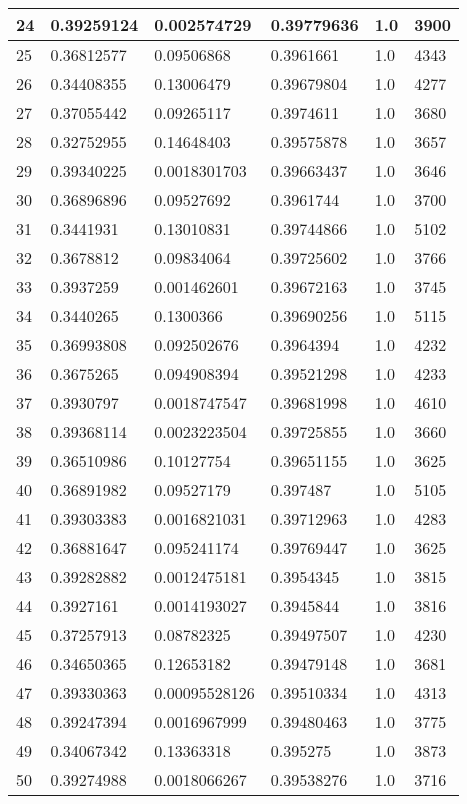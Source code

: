 \begin{longtable}{|l|l|l|l|l|l|}
24 & 0.39259124 & 0.002574729 & 0.39779636 & 1.0 & 3900 \\ \hline 
25 & 0.36812577 & 0.09506868 & 0.3961661 & 1.0 & 4343 \\ \hline 
26 & 0.34408355 & 0.13006479 & 0.39679804 & 1.0 & 4277 \\ \hline 
27 & 0.37055442 & 0.09265117 & 0.3974611 & 1.0 & 3680 \\ \hline 
28 & 0.32752955 & 0.14648403 & 0.39575878 & 1.0 & 3657 \\ \hline 
29 & 0.39340225 & 0.0018301703 & 0.39663437 & 1.0 & 3646 \\ \hline 
30 & 0.36896896 & 0.09527692 & 0.3961744 & 1.0 & 3700 \\ \hline 
31 & 0.3441931 & 0.13010831 & 0.39744866 & 1.0 & 5102 \\ \hline 
32 & 0.3678812 & 0.09834064 & 0.39725602 & 1.0 & 3766 \\ \hline 
33 & 0.3937259 & 0.001462601 & 0.39672163 & 1.0 & 3745 \\ \hline 
34 & 0.3440265 & 0.1300366 & 0.39690256 & 1.0 & 5115 \\ \hline 
35 & 0.36993808 & 0.092502676 & 0.3964394 & 1.0 & 4232 \\ \hline 
36 & 0.3675265 & 0.094908394 & 0.39521298 & 1.0 & 4233 \\ \hline 
37 & 0.3930797 & 0.0018747547 & 0.39681998 & 1.0 & 4610 \\ \hline 
38 & 0.39368114 & 0.0023223504 & 0.39725855 & 1.0 & 3660 \\ \hline 
39 & 0.36510986 & 0.10127754 & 0.39651155 & 1.0 & 3625 \\ \hline 
40 & 0.36891982 & 0.09527179 & 0.397487 & 1.0 & 5105 \\ \hline 
41 & 0.39303383 & 0.0016821031 & 0.39712963 & 1.0 & 4283 \\ \hline 
42 & 0.36881647 & 0.095241174 & 0.39769447 & 1.0 & 3625 \\ \hline 
43 & 0.39282882 & 0.0012475181 & 0.3954345 & 1.0 & 3815 \\ \hline 
44 & 0.3927161 & 0.0014193027 & 0.3945844 & 1.0 & 3816 \\ \hline 
45 & 0.37257913 & 0.08782325 & 0.39497507 & 1.0 & 4230 \\ \hline 
46 & 0.34650365 & 0.12653182 & 0.39479148 & 1.0 & 3681 \\ \hline 
47 & 0.39330363 & 0.00095528126 & 0.39510334 & 1.0 & 4313 \\ \hline 
48 & 0.39247394 & 0.0016967999 & 0.39480463 & 1.0 & 3775 \\ \hline 
49 & 0.34067342 & 0.13363318 & 0.395275 & 1.0 & 3873 \\ \hline 
50 & 0.39274988 & 0.0018066267 & 0.39538276 & 1.0 & 3716 \\ \hline 
\end{longtable}